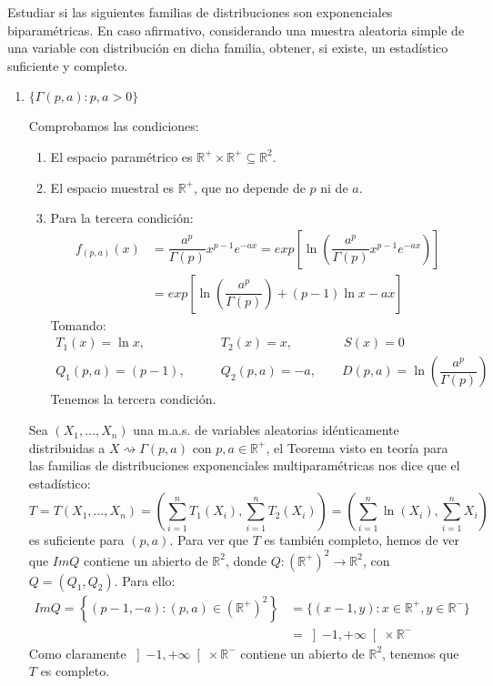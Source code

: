 \begin{ejercicio}
    Estudiar si las siguientes familias de distribuciones son exponenciales biparamétricas.  En caso afirmativo, considerando una muestra aleatoria simple de una variable con distribución en dicha familia, obtener, si existe, un estadístico suficiente y completo.
    \begin{enumerate}[label=\alph*)]
        \item $\{\Gamma(p,a) : p,a>0\}$

            Comprobamos las condiciones:
            \begin{enumerate}[label=\arabic*.]
                \item El espacio paramétrico es $\mathbb{R}^+\times \mathbb{R}^+\subseteq \mathbb{R}^2$.
                \item El espacio muestral es $\mathbb{R}^+$, que no depende de $p$ ni de $a$.
                \item Para la tercera condición:
                    \begin{align*}
                        f_{(p,a)}(x) &= \dfrac{a^p}{\Gamma(p)} x^{p-1}e^{-ax} = exp\left[\ln\left(\dfrac{a^p}{\Gamma(p)} x^{p-1}e^{-ax} \right)\right] \\ &= exp\left[\ln\left(\dfrac{a^p}{\Gamma(p)}\right) + (p-1)\ln x - ax\right]
                    \end{align*}
                Tomando:
                \begin{align*}
                    T_1(x) = \ln x, &\qquad  T_2(x) = x, \qquad \qquad   S(x) = 0 \\
                    Q_1(p,a) = (p-1), &\qquad Q_2(p,a) = -a, \qquad D(p,a) = \ln\left(\dfrac{a^p}{\Gamma(p)}\right) 
                \end{align*}
                Tenemos la tercera condición.
            \end{enumerate}
            Sea $(X_1, \ldots, X_n)$ una m.a.s. de variables aleatorias idénticamente distribuidas a $X\rightsquigarrow \Gamma(p,a)$ con $p,a\in \mathbb{R}^+$, el Teorema visto en teoría para las familias de distribuciones exponenciales multiparamétricas nos dice que el estadístico:
            \begin{equation*}
                T = T(X_1, \ldots, X_n) = \left(\sum_{i=1}^{n}T_1(X_i), \sum_{i=1}^{n}T_2(X_i)\right) = \left(\sum_{i=1}^{n}\ln(X_i), \sum_{i=1}^{n}X_i\right)
            \end{equation*}
            es suficiente para $(p,a)$. Para ver que $T$ es también completo, hemos de ver que $Im Q$ contiene un abierto de $\mathbb{R}^2$, donde $Q:{(\mathbb{R}^+)}^{2}\to \mathbb{R}^2$, con $Q=(Q_1,Q_2)$. Para ello:
            \begin{align*}
                Im Q = \left\{(p-1,-a) : (p,a)\in {(\mathbb{R}^+)}^{2}\right\} &= \{(x-1,y) : x\in \mathbb{R}^+, y\in \mathbb{R}^-\} \\ &= \left]-1,+\infty\right[\times \mathbb{R}^-
            \end{align*}
            Como claramente $\left]-1,+\infty\right[\times\mathbb{R}^-$ contiene un abierto de $\mathbb{R}^2$, tenemos que $T$ es completo.


\end{enumerate}
\end{ejercicio}
